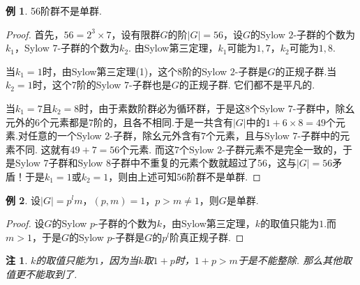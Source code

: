 \documentclass[12pt]{ctexart}
\theoremstyle{definition}
\newtheorem{example}{例}
\theoremstyle{plain}
\newtheorem*{remark}{注}
\begin{document}
	\begin{example}
		56阶群不是单群.
	\end{example}
	\begin{proof}
		首先，$56=2^3\times 7$，设有限群$G$的阶$|G|=56$，设$G$的Sylow $2$-子群的个数为$k_1$，Sylow $7$-子群的个数为$k_2$. 由Sylow第三定理，$k_1$可能为$1,7$，$k_2$可能为$1,8$.
		
		当$k_1=1$时，由Sylow第三定理(1)，这个$8$阶的Sylow $2$-子群是$G$的正规子群.当$k_2=1$时，这个$7$阶的Sylow $7$-子群也是$G$的正规子群. 它们都不是平凡的.
		
		当$k_1=7$且$k_2=8$时，由于素数阶群必为循环群，于是这$8$个Sylow $7$-子群中，除幺元外的$6$个元素都是$7$阶的，且各不相同.于是一共含有$|G|$中的$1+6\times 8=49$个元素.对任意的一个Sylow $2$-子群，除幺元外含有$7$个元素，且与Sylow $7$-子群中的元素不同. 这就有$49+7=56$个元素. 而这$7$个Sylow $2$-子群元素不是完全一致的，于是Sylow $7$子群和Sylow $8$子群中不重复的元素个数就超过了$56$，这与$|G|=56$矛盾！于是$k_1=1$或$k_2=1$，则由上述可知$56$阶群不是单群.
	\end{proof}
	\begin{example}
		设$|G|=p^lm$，$(p,m)=1$，$p>m\neq 1$，则$G$是单群.
	\end{example}
	\begin{proof}
		设$G$的Sylow $p$-子群的个数为$k$，由Sylow第三定理，$k$的取值只能为$1$.而$m>1$，于是$G$的Sylow $p$-子群是$G$的$p^l$阶真正规子群.
	\end{proof}
	\begin{remark}
		$k$的取值只能为$1$，因为当$k$取$1+p$时，$1+p>m$于是不能整除. 那么其他取值更不能取到了.
	\end{remark}
	
\end{document}
